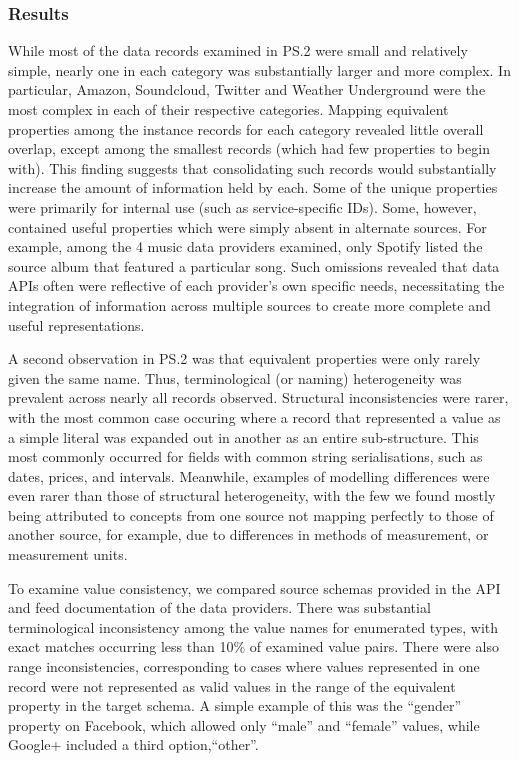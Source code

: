 \documentclass{sigchi}
\begin{document}
\subsubsection{Results}
While most of the data records examined in PS.2 were small and relatively simple, nearly one in each category was substantially larger and more complex. In particular, Amazon, Soundcloud, Twitter and Weather Underground were the most complex in each of their respective categories. Mapping equivalent properties among the instance records for each category revealed little overall overlap, except among the smallest records (which had few properties to begin with).  This finding suggests that consolidating such records would substantially increase the amount of information held by each.  Some of the unique properties were primarily for internal use (such as service-specific IDs).  Some, however, contained useful properties which were simply absent in alternate sources.  For example, among the 4 music data providers examined, only Spotify listed the source album that featured a particular song.  Such omissions revealed that data APIs often were reflective of each provider's own specific needs, necessitating the integration of information across multiple sources to create more complete and useful representations.

A second observation in PS.2 was that equivalent properties were only rarely given the same name. Thus, terminological (or naming) heterogeneity was prevalent across nearly all records observed.  Structural inconsistencies were rarer, with the most common case occuring where a record that represented a value as a simple literal was expanded out in another as an entire sub-structure.  This most commonly occurred for fields with common string serialisations, such as dates, prices, and intervals.  Meanwhile, examples of modelling differences were even rarer than those of structural heterogeneity, with the few we found mostly being attributed to concepts from one source not mapping perfectly to those of another source, for example, due to differences in methods of measurement, or measurement units.

To examine value consistency, we compared source schemas provided in the API and feed documentation of the data providers.  There was substantial terminological inconsistency among the value names for enumerated types, with exact matches occurring less than 10\% of examined value pairs.  There were also range inconsistencies, corresponding to cases where values represented in one record were not represented as valid values in the range of the equivalent property in the target schema.  A simple example of this was the ``gender'' property  on Facebook, which allowed only ``male'' and ``female'' values, while Google+ included a third option,``other''.  
\end{document}
